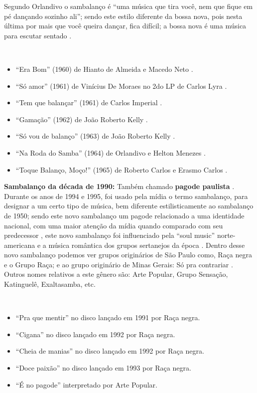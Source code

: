Segundo Orlandivo o sambalanço é ``uma música que tira você, nem que fique em pé dançando sozinho ali'';
sendo este estilo diferente da bossa nova, pois nesta última por mais que você queira dançar, fica difícil;
a bossa nova é uma música para escutar sentado \cite{de2017sambalanco}.
\begin{example} ~

\begin{itemize}
\item ``Era Bom'' (1960) de Hianto de Almeida e Macedo Neto  \cite[pp. 123]{de2003tem}.
\item ``Só amor'' (1961) de Vinícius De Moraes no 2do LP de Carlos Lyra \cite[pp. 142]{lyrasongbook}. 
\item ``Tem que balançar'' (1961) de Carlos Imperial  \cite{de2017sambalanco}.
\item ``Gamação'' (1962) de João Roberto Kelly \cite[pp. 122]{de2003tem}.
\item ``Só vou de balanço'' (1963) de João Roberto Kelly \cite{de2017sambalanco}.
\item ``Na Roda do Samba'' (1964) de Orlandivo e Helton Menezes \cite{de2017sambalanco} \cite[pp. 122]{de2003tem}.
\item ``Toque Balanço, Moço!'' (1965) de Roberto Carlos e Erasmo Carlos \cite{de2017sambalanco} \cite[pp. 123]{de2003tem}.
\end{itemize}
\end{example}

\textbf{Sambalanço da década de 1990:} Também chamado \textbf{pagode paulista}  \cite[pp. 130]{perna2002samba}.
Durante os anos de 1994 e 1995, 
foi usado pela mídia o termo sambalanço, para designar a um certo tipo de música, 
bem diferente estilisticamente ao sambalanço de 1950;
sendo este novo sambalanço um pagode relacionado a uma identidade nacional,
com uma maior atenção da mídia quando comparado com seu predecessor \cite[pp. 127]{vianna1999bezerra},
este novo sambalanço foi influenciado pela ``soul music'' norte-americana e a música romântica dos grupos sertanejos da época  \cite[pp. 130-131]{perna2002samba}.
Dentro desse novo sambalanço podemos ver grupos originários de São Paulo como, Raça negra e o Grupo Raça;
e ao grupo originário de Minas Gerais: Só pra contrariar \cite[pp. 130]{perna2002samba} \cite[pp. 128]{vianna1999bezerra}.
Outros nomes relativos a este gênero são: Arte Popular, Grupo Sensação, Katinguelê, Exaltasamba, etc.

\begin{example} ~

\begin{itemize}
\item ``Pra que mentir'' no disco lançado em 1991 por Raça negra.
\item ``Cigana'' no disco lançado em 1992 por Raça negra.
\item ``Cheia de manias'' no disco lançado em 1992 por Raça negra.
\item ``Doce paixão'' no disco lançado em 1993 por Raça negra.
\item ``É no pagode'' interpretado por Arte Popular.
\end{itemize}
\end{example}


